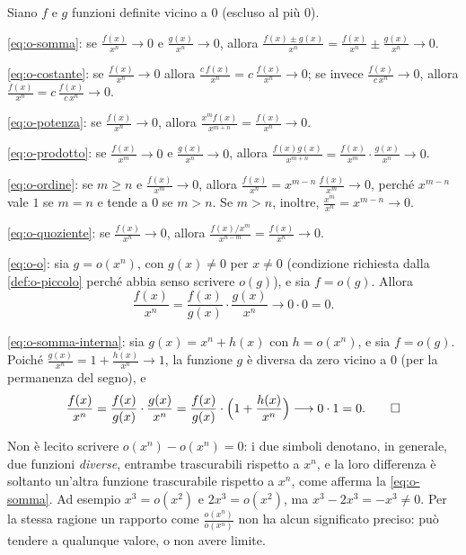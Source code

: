 \begin{dimostrazione}
Siano $f$ e $g$ funzioni definite vicino a $0$ (escluso al più $0$).

\eqref{eq:o-somma}: se $\frac{f(x)}{x^{n}}\to0$ e $\frac{g(x)}{x^{n}}\to0$, allora
$\frac{f(x)\pm g(x)}{x^{n}}=\frac{f(x)}{x^{n}}\pm\frac{g(x)}{x^{n}}\to0$.

\eqref{eq:o-costante}: se $\frac{f(x)}{x^{n}}\to0$ allora $\frac{c\,f(x)}{x^{n}}=c\,\frac{f(x)}{x^{n}}\to0$; se invece
$\frac{f(x)}{c\,x^{n}}\to0$, allora $\frac{f(x)}{x^{n}}=c\,\frac{f(x)}{c\,x^{n}}\to0$.

\eqref{eq:o-potenza}: se $\frac{f(x)}{x^{n}}\to0$, allora $\frac{x^{m}f(x)}{x^{m+n}}=\frac{f(x)}{x^{n}}\to0$.

\eqref{eq:o-prodotto}: se $\frac{f(x)}{x^{m}}\to0$ e $\frac{g(x)}{x^{n}}\to0$, allora
$\frac{f(x)g(x)}{x^{m+n}}=\frac{f(x)}{x^{m}}\cdot\frac{g(x)}{x^{n}}\to0$.

\eqref{eq:o-ordine}: se $m\ge n$ e $\frac{f(x)}{x^{m}}\to0$, allora $\frac{f(x)}{x^{n}}=x^{m-n}\,\frac{f(x)}{x^{m}}\to0$,
perché $x^{m-n}$ vale $1$ se $m=n$ e tende a $0$ se $m>n$. Se $m>n$, inoltre,
$\frac{x^{m}}{x^{n}}=x^{m-n}\to0$.

\eqref{eq:o-quoziente}: se $\frac{f(x)}{x^{n}}\to0$, allora $\frac{f(x)/x^{m}}{x^{n-m}}=\frac{f(x)}{x^{n}}\to0$.

\eqref{eq:o-o}: sia $g=o(x^{n})$, con $g(x)\neq0$ per $x\neq0$ (condizione richiesta dalla
\cref{def:o-piccolo} perché abbia senso scrivere $o(g)$), e sia $f=o(g)$. Allora
\[
  \frac{f(x)}{x^{n}}=\frac{f(x)}{g(x)}\cdot\frac{g(x)}{x^{n}}\longrightarrow0\cdot0=0 .
\]

\eqref{eq:o-somma-interna}: sia $g(x)=x^{n}+h(x)$ con $h=o(x^{n})$, e sia $f=o(g)$. Poiché
$\frac{g(x)}{x^{n}}=1+\frac{h(x)}{x^{n}}\to1$, la funzione $g$ è diversa da zero vicino a $0$ (per la
permanenza del segno), e
\[
  \frac{f(x)}{x^{n}}=\frac{f(x)}{g(x)}\cdot\frac{g(x)}{x^{n}}
  =\frac{f(x)}{g(x)}\cdot\Bigl(1+\frac{h(x)}{x^{n}}\Bigr)\longrightarrow0\cdot1=0 . \qedhere
\]
\end{dimostrazione}

\begin{attenzione}
Non è lecito scrivere $o(x^{n})-o(x^{n})=0$: i due simboli denotano, in generale, due funzioni
\emph{diverse}, entrambe trascurabili rispetto a $x^{n}$, e la loro differenza è soltanto
un'altra funzione trascurabile rispetto a $x^{n}$, come afferma la \eqref{eq:o-somma}. Ad
esempio $x^{3}=o(x^{2})$ e $2x^{3}=o(x^{2})$, ma $x^{3}-2x^{3}=-x^{3}\neq0$. Per la stessa ragione un
rapporto come $\frac{o(x^{n})}{o(x^{n})}$ non ha alcun significato preciso: può tendere a qualunque
valore, o non avere limite.
\end{attenzione}

